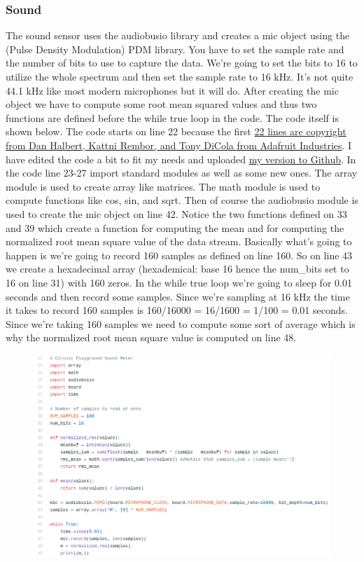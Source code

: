 {\subsubsection{Sound}
The sound sensor uses the audiobusio library and creates a mic object
using the (Pulse Density Modulation) PDM library. You have to set the
sample rate and the number of bits to use to capture the data. We’re
going to set the bits to 16 to utilize the whole spectrum and then set
the sample rate to 16 kHz. It’s not quite 44.1 kHz like most modern
microphones but it will do. After creating the mic object we have to
compute some root mean squared values and thus two functions are
defined before the while true loop in the code. The code itself is
shown below. The code starts on line 22 because the
first \href{https://learn.adafruit.com/adafruit-pdm-microphone-breakout/circuitpython}{22
lines are copyright from Dan Halbert, Kattni Rembor, and Tony DiCola
from Adafruit Industries}. I have edited the code a bit to fit my
needs and
uploaded \href{https://github.com/cmontalvo251/Microcontrollers/blob/master/Circuit_Playground/CircuitPython/Audio/record_sound_simple.py}{my
version to Github}. In the code line 23-27 import standard modules as
well as some new ones. The array module is used to create array like
matrices. The math module is used to compute functions like cos, sin,
and sqrt. Then of course the audiobusio module is used to create the
mic object on line 42. Notice the two functions defined on 33 and 39
which create a function for computing the mean and for computing the
normalized root mean square value of the data stream. Basically what’s
going to happen is we’re going to record 160 samples as defined on
line 160. So on line 43 we create a hexadecimal array (hexademical:
base 16 hence the num\_bits set to 16 on line 31) with 160 zeros. In
the while true loop we’re going to sleep for 0.01 seconds and then
record some samples. Since we’re sampling at 16 kHz the time it takes
to record 160 samples is 160/16000 = 16/1600 = 1/100 = 0.01
seconds. Since we’re taking 160 samples we need to compute some sort
of average which is why the normalized root mean square value is
computed on line 48. 
\begin{figure}[H]
  \begin{center}
    \includegraphics[width=\textwidth]{Figures/sound_code.png}

\end{center}
\end{figure}}
